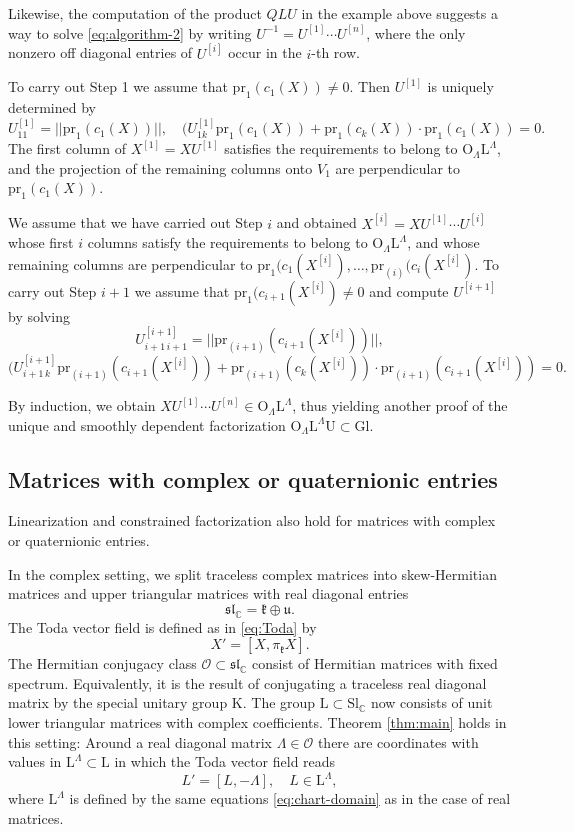 \documentclass[reqno]{amsart}
\newcommand{\uu}{\mathfrak{u}}
\renewcommand{\sl}{\mathfrak{sl}}
\newcommand{\cO}{\mathcal{O}}
\newcommand{\C}{\mathbb{C}}
\newcommand{\pr}{\mathrm{pr}}
\newcommand{\Sl}{\mathrm{Sl}}
\newcommand{\Gl}{\mathrm{Gl}}
\renewcommand{\L}{\mathrm{L}}
\newcommand{\U}{\mathrm{U}}
\theoremstyle{definition} %
\begin{document}
Likewise, the computation of the product $QLU$ in the example above suggests a way to solve \eqref{eq:algorithm-2} by writing $U^{-1}=U^{[1]}\cdots U^{[n]}$, where the only nonzero off diagonal entries of $U^{[i]}$ occur in the $i$-th row.

To carry out Step 1 we assume that   $\pr_1(c_1(X))\neq 0$. Then $U^{[1]}$ is uniquely determined by
\[U^{[1]}_{11}=||\pr_1(c_1(X))||,\quad (U^{[1]}_{1k}\pr_1(c_1(X))+\pr_1(c_k(X))\cdot \pr_1(c_1(X))=0.\]
The first column of  $X^{[1]}=XU^{[1]}$ satisfies the requirements to belong to $\mathrm{O}_\Lambda \L^\Lambda$, and the projection of the remaining columns onto $V_1$ are perpendicular to $\pr_1(c_1(X))$.

We assume that we have carried out Step $i$ and obtained $X^{[i]}=XU^{[1]}\cdots U^{[i]}$ whose first $i$ columns satisfy the requirements to belong to $\mathrm{O}_\Lambda\L^\Lambda$, and whose remaining columns are perpendicular to $\pr_{1}(c_1(X^{[i]}),\dots,\pr_{(i)}(c_i(X^{[i]})$. To carry out Step $i+1$ we assume that
 $\pr_1(c_{i+1}(X^{[i]})\neq 0$ and compute $U^{[i+1]}$ by solving
 \[U^{[i+1]}_{i+1\,i+1}=||\pr_{(i+1)}(c_{i+1}(X^{[i]}))||,\]
 \[(U^{[i+1]}_{i+1\,k}\pr_{(i+1)}(c_{i+1}(X^{[i]}))+\pr_{(i+1)}(c_k(X^{[i]}))\cdot \pr_{(i+1)}(c_{i+1}(X^{[i]}))=0.\]

By induction, we obtain $XU^{[1]}\cdots U^{[n]}\in \mathrm{O}_\Lambda\L^\Lambda$, thus yielding another proof of the unique and smoothly dependent factorization  $\mathrm{O}_\Lambda\L^\Lambda\U\subset \Gl$.



\subsection{Matrices with complex or quaternionic entries}

Linearization and constrained factorization  also hold for matrices with complex or quaternionic entries.

In the complex setting, we split traceless complex matrices into skew-Hermitian matrices and upper triangular matrices with real diagonal entries
\begin{equation}\label{eq:Toda-complex}\sl_\C=\mathfrak{k}\oplus \uu.
 \end{equation}
The Toda vector field is defined as in \eqref{eq:Toda} by
\[X'=[X,\pi_{\mathfrak{k}}X].\]
 The Hermitian conjugacy class $\cO\subset \sl_\C$ consist of Hermitian matrices with fixed spectrum. Equivalently, it is the result of conjugating a traceless real diagonal matrix by the special unitary group $\mathrm{K}$. The group $\L\subset \Sl_\C$ now consists of unit lower triangular matrices with complex coefficients. Theorem \ref{thm:main} holds in this setting: Around a real diagonal matrix $\Lambda\in \cO$ there are coordinates with values  in $\L^\Lambda\subset \L$ in which the Toda vector field reads
 \[L'=[L,-\Lambda],\quad L\in \L^\Lambda,\]
  where $\L^\Lambda$ is defined by the same equations \eqref{eq:chart-domain} as in the case of real matrices.
\end{document}
